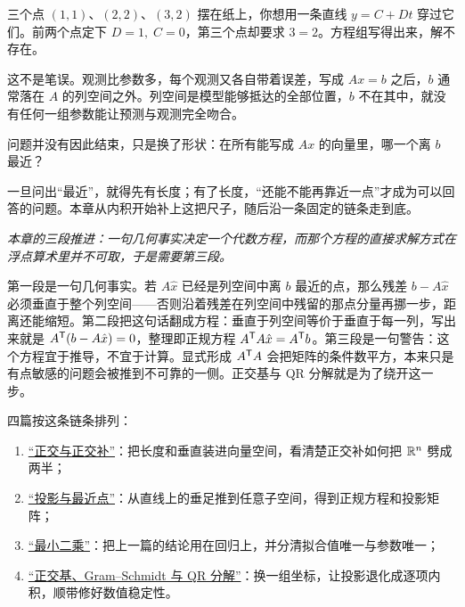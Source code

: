 三个点 \((1,1)\)、\((2,2)\)、\((3,2)\) 摆在纸上，你想用一条直线 \(y=C+Dt\) 穿过它们。前两个点定下 \(D=1,\;C=0\)，第三个点却要求 \(3=2\)。方程组写得出来，解不存在。

这不是笔误。观测比参数多，每个观测又各自带着误差，写成 \(Ax=b\) 之后，\(b\) 通常落在 \(A\) 的列空间之外。列空间是模型能够抵达的全部位置，\(b\) 不在其中，就没有任何一组参数能让预测与观测完全吻合。

问题并没有因此结束，只是换了形状：在所有能写成 \(Ax\) 的向量里，哪一个离 \(b\) 最近？

一旦问出``最近''，就得先有长度；有了长度，``还能不能再靠近一点''才成为可以回答的问题。本章从内积开始补上这把尺子，随后沿一条固定的链条走到底。

\begin{center}

\emph{本章的三段推进：一句几何事实决定一个代数方程，而那个方程的直接求解方式在浮点算术里并不可取，于是需要第三段。}
\end{center}

第一段是一句几何事实。若 \(A\hat x\) 已经是列空间中离 \(b\) 最近的点，那么残差 \(b-A\hat x\) 必须垂直于整个列空间——否则沿着残差在列空间中残留的那点分量再挪一步，距离还能缩短。第二段把这句话翻成方程：垂直于列空间等价于垂直于每一列，写出来就是 \(A^{\mathsf{T}}(b-A\hat x)=0\)，整理即正规方程 \(A^{\mathsf{T}}A\hat x=A^{\mathsf{T}}b\)。第三段是一句警告：这个方程宜于推导，不宜于计算。显式形成 \(A^{\mathsf{T}}A\) 会把矩阵的条件数平方，本来只是有点敏感的问题会被推到不可靠的一侧。正交基与 QR 分解就是为了绕开这一步。

四篇按这条链条排列：

\begin{enumerate}
\tightlist
\item \hyperref[sec:03-Linear-Algebra/03-Orthogonality/01]{``正交与正交补''}：把长度和垂直装进向量空间，看清楚正交补如何把 \(\mathbb{R}^n\) 劈成两半；
\item \hyperref[sec:03-Linear-Algebra/03-Orthogonality/02]{``投影与最近点''}：从直线上的垂足推到任意子空间，得到正规方程和投影矩阵；
\item \hyperref[sec:03-Linear-Algebra/03-Orthogonality/03]{``最小二乘''}：把上一篇的结论用在回归上，并分清拟合值唯一与参数唯一；
\item \hyperref[sec:03-Linear-Algebra/03-Orthogonality/04]{``正交基、Gram--Schmidt 与 QR 分解''}：换一组坐标，让投影退化成逐项内积，顺带修好数值稳定性。
\end{enumerate}

